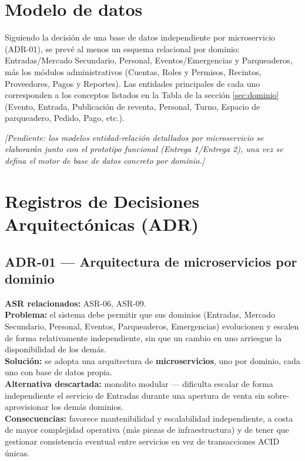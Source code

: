\documentclass[11pt,a4paper]{article}
\newcommand{\pendiente}[1]{\textit{\textcolor{grisoscuro}{[Pendiente: #1]}}}
\begin{document}
\section{Modelo de datos}
\label{sec:datos}

Siguiendo la decisión de una base de datos independiente por microservicio (ADR-01), se prevé al
menos un esquema relacional por dominio: Entradas/Mercado Secundario, Personal, Eventos/Emergencias
y Parqueaderos, más los módulos administrativos (Cuentas, Roles y Permisos, Recintos, Proveedores,
Pagos y Reportes). Las entidades principales de cada uno corresponden a los conceptos listados en
la Tabla de la sección \ref{sec:dominio} (Evento, Entrada, Publicación de reventa, Personal, Turno,
Espacio de parqueadero, Pedido, Pago, etc.).

\pendiente{los modelos entidad-relación detallados por microservicio se elaborarán junto con el
prototipo funcional (Entrega 1/Entrega 2), una vez se defina el motor de base de datos concreto
por dominio.}

\section{Registros de Decisiones Arquitectónicas (ADR)}
\label{sec:adr}

\subsection*{ADR-01 --- Arquitectura de microservicios por dominio}
\textbf{ASR relacionados:} ASR-06, ASR-09.\\
\textbf{Problema:} el sistema debe permitir que sus dominios (Entradas, Mercado Secundario,
Personal, Eventos, Parqueaderos, Emergencias) evolucionen y escalen de forma relativamente
independiente, sin que un cambio en uno arriesgue la disponibilidad de los demás.\\
\textbf{Solución:} se adopta una arquitectura de \textbf{microservicios}, uno por dominio, cada
uno con base de datos propia.\\
\textbf{Alternativa descartada:} monolito modular — dificulta escalar de forma independiente el
servicio de Entradas durante una apertura de venta sin sobre-aprovisionar los demás dominios.\\
\textbf{Consecuencias:} favorece mantenibilidad y escalabilidad independiente, a costa de mayor
complejidad operativa (más piezas de infraestructura) y de tener que gestionar consistencia
eventual entre servicios en vez de transacciones ACID únicas.
\end{document}

